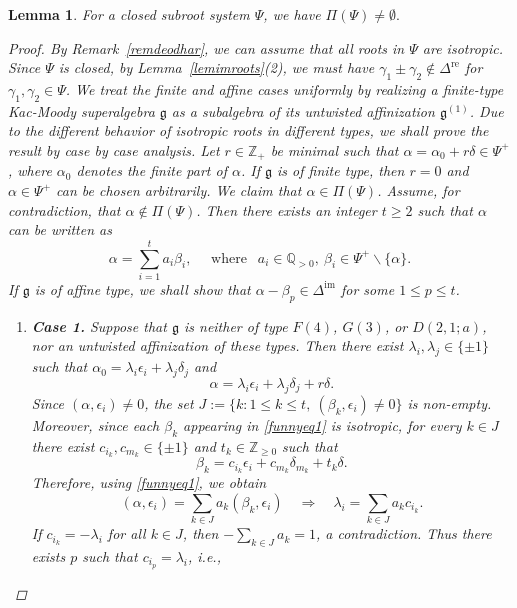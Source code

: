 \documentclass[11pt,reqno]{amsart}
\theoremstyle{plain}
\newtheorem*{lemma}{Lemma}
\theoremstyle{definition}
\theoremstyle{remark}
\newcommand{\lie}[1]{\mathfrak{#1}}
\numberwithin{equation}{section}
\begin{document}
\begin{lemma}\label{lempipsi} For a closed subroot system $\Psi$, we have $\Pi(\Psi)\neq \emptyset.$ 
\begin{proof}
 By Remark~\ref{remdeodhar}, we can assume that all roots in $\Psi$ are isotropic. Since $\Psi$ is closed, by Lemma~\ref{lemimroots}(2), we must have $\gamma_1\pm \gamma_2\notin \Delta^{\mathrm{re}}$ for $\gamma_1,\gamma_2\in \Psi$.
 We treat the finite and affine cases uniformly by realizing a finite-type Kac-Moody superalgebra $\lie g$ as a subalgebra of its untwisted affinization $\lie g^{(1)}$. Due to the different behavior of isotropic roots in different types, we shall prove the result by case by case analysis. Let $r\in\mathbb{Z}_{+}$ be minimal such that $\alpha=\alpha_0+r\delta\in\Psi^+$, where $\alpha_0$ denotes the finite part of $\alpha$. If $\lie g$ is of finite type, then $r=0$ and $\alpha\in\Psi^+$ can be chosen arbitrarily. We claim that $\alpha\in\Pi(\Psi)$. Assume, for contradiction, that $\alpha\notin\Pi(\Psi)$. Then there exists an integer $t\geq 2$ such that $\alpha$ can be written as
\begin{equation}\label{funnyeq1}
\alpha = \sum_{i=1}^t a_i \beta_i,\quad\text{ where }\ \ a_i\in\mathbb{Q}_{>0},\ \beta_i\in\Psi^+\backslash\{\alpha\}.
\end{equation}
    If $\lie g$ is of affine type, we shall show that $\alpha-\beta_p\in\Delta^{\mathrm{im}}$ for some $1\le p\le t$.
    \begin{enumerate}[leftmargin=*]
        \item \textbf{Case 1.} Suppose that $\lie g$ is neither of type $F(4)$, $G(3)$, or $D(2,1;a)$, nor an untwisted affinization of these types. Then there exist $\lambda_i,\lambda_j\in\{\pm 1\}$ such that $\alpha_0=\lambda_i\epsilon_i+\lambda_j\delta_j$ and 
        $$\alpha=\lambda_i\epsilon_i+\lambda_j\delta_j+r\delta.$$
Since $(\alpha,\epsilon_i)\neq 0$, the set $J:=\{k: 1\le k\le t,\ (\beta_k,\epsilon_i)\neq 0\}$ is non-empty. Moreover, since each $\beta_k$ appearing in \eqref{funnyeq1} is isotropic, for every $k\in J$ there exist $c_{i_k},c_{m_k}\in\{\pm 1\}$ and $t_k\in\mathbb{Z}_{\ge 0}$ such that
    $$\beta_k=c_{i_k}\epsilon_i+c_{m_k}\delta_{m_k}+t_k\delta.$$
     Therefore, using \eqref{funnyeq1}, we obtain
     $$(\alpha,\epsilon_i)=\sum_{k\in J}a_k(\beta_k,\epsilon_i)\quad \Longrightarrow \quad \lambda_i=\sum_{k\in J}a_kc_{i_k}.$$
     If $c_{i_k}=-\lambda_i$ for all $k\in J$, then $-\sum_{k\in J}a_k=1$, a contradiction. Thus there exists $p$ such that $c_{i_p}=\lambda_i$, i.e.,

\end{enumerate}
\end{proof}
\end{lemma}
\end{document}
